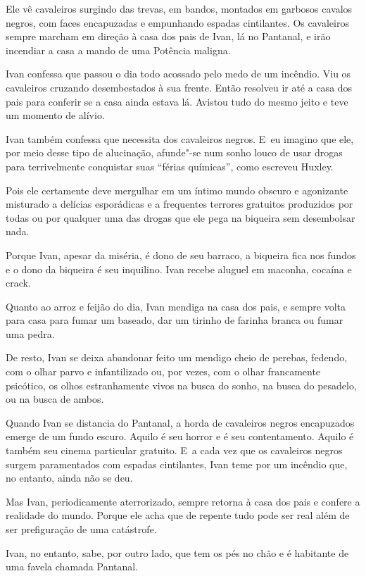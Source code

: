 Ele vê cavaleiros surgindo das trevas, em bandos, montados em garbosos
cavalos negros, com faces encapuzadas e empunhando espadas cintilantes.
Os cavaleiros sempre marcham em direção à casa dos pais de Ivan, lá no
Pantanal, e irão incendiar a casa a mando de uma Potência maligna.

Ivan confessa que passou o dia todo acossado pelo medo de um incêndio.
Viu os cavaleiros cruzando desembestados à sua frente. Então resolveu ir
até a casa dos pais para conferir se a casa ainda estava lá. Avistou
tudo do mesmo jeito e teve um momento de alívio.

Ivan também confessa que necessita dos cavaleiros negros. E~eu imagino
que ele, por meio desse tipo de alucinação, afunde"-se num sonho louco de
usar drogas para terrivelmente conquistar suas ``férias químicas'', como
escreveu Huxley.

Pois ele certamente deve mergulhar em um íntimo mundo obscuro e
agonizante misturado a delícias esporádicas e a frequentes terrores
gratuitos produzidos por todas ou por qualquer uma das drogas que ele
pega na biqueira sem desembolsar nada.

Porque Ivan, apesar da miséria, é dono de seu barraco, a biqueira fica
nos fundos e o dono da biqueira é seu inquilino. Ivan recebe aluguel em
maconha, cocaína e crack.

Quanto ao arroz e feijão do dia, Ivan mendiga na casa dos pais, e sempre
volta para casa para fumar um baseado, dar um tirinho de farinha branca
ou fumar uma pedra.

De resto, Ivan se deixa abandonar feito um mendigo cheio de perebas,
fedendo, com o olhar parvo e infantilizado ou, por vezes, com o olhar
francamente psicótico, os olhos estranhamente vivos na busca do sonho,
na busca do pesadelo, ou na busca de ambos.

\asterisc{}

Quando Ivan se distancia do Pantanal, a horda de cavaleiros negros
encapuzados emerge de um fundo escuro. Aquilo é seu horror e é seu
contentamento. Aquilo é também seu cinema particular gratuito. E~a cada
vez que os cavaleiros negros surgem paramentados com espadas
cintilantes, Ivan teme por um incêndio que, no entanto, ainda não se
deu.

Mas Ivan, periodicamente aterrorizado, sempre retorna à casa dos pais e
confere a realidade do mundo. Porque ele acha que de repente tudo pode
ser real além de ser prefiguração de uma catástrofe.

Ivan, no entanto, sabe, por outro lado, que tem os pés no chão e é
habitante de uma favela chamada Pantanal.

